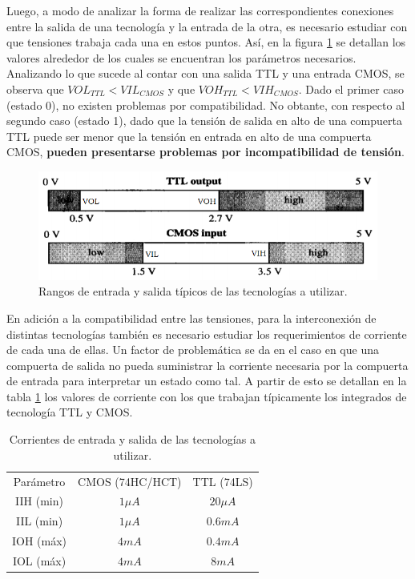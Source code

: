 \noindent
Luego, a modo de analizar la forma de realizar las correspondientes conexiones entre la salida de una tecnolog\'ia y la entrada de la otra, es necesario estudiar con que tensiones trabaja cada una en estos puntos. As\'i, en la figura \ref{ej5_fig:comparador_rangos} se detallan los valores alrededor de los cuales se encuentran los par\'ametros necesarios. Analizando lo que sucede al contar con una salida TTL y una entrada CMOS, se observa que $VOL_{TTL} < VIL_{CMOS}$ y que $VOH_{TTL} < VIH_{CMOS}$. Dado el primer caso (estado 0), no existen problemas por compatibilidad. No obtante, con respecto al segundo caso (estado 1), dado que la tensi\'on de salida en alto de una compuerta TTL puede ser menor que la tensi\'on en entrada en alto de una compuerta CMOS, \textbf{pueden presentarse problemas por incompatibilidad de tensi\'on}\label{ej5_ref:problema}.

\begin{figure}[H]
    \centering
    \includegraphics[scale=0.4]{figs/ej5/comparador_rangos_completo.png}
    \caption{Rangos de entrada y salida t\'ipicos de las tecnolog\'ias a utilizar.}
    \label{ej5_fig:comparador_rangos}
\end{figure}


\noindent
En adici\'on a la compatibilidad entre las tensiones, para la interconexi\'on de distintas tecnolog\'ias tambi\'en es necesario estudiar los requerimientos de corriente de cada una de ellas. Un factor de problem\'atica se da en el caso en que una compuerta de salida no pueda suministrar la corriente necesaria por la compuerta de entrada para interpretar un estado como tal. A partir de esto se detallan en la tabla \ref{ej5_tab:current_comparison} los valores de corriente con los que trabajan t\'ipicamente los integrados de tecnolog\'ia TTL y CMOS.

\begin{table}[H]
\centering
\begin{tabular}{ccc}
Par\'ametro & CMOS (74HC/HCT)     & TTL (74LS)   \\
IIH (min)      & $1\mu A$      & $20\mu A$  \\
IIL (min)      & $1\mu A$      & $0.6mA$ \\
IOH (m\'ax)      & $4mA$      & $0.4mA$ \\
IOL (m\'ax)      & $4mA$      & $8mA  $
\end{tabular}
\caption{Corrientes de entrada y salida de las tecnolog\'ias a utilizar.}
\label{ej5_tab:current_comparison}
\end{table}

